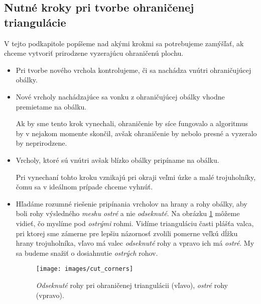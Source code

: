 \subsection{Nutné kroky pri tvorbe ohraničenej triangulácie}

V tejto podkapitole popíšeme nad akými krokmi sa potrebujeme zamýšľať, ak chceme vytvoriť prirodzene 
vyzerajúcu ohraničenú plochu.

\begin{itemize}
    \item{
        Pri tvorbe nového vrchola kontrolujeme, či sa nachádza vnútri ohraničujúcej obálky.
    }
    \item{
        Nové vrcholy nachádzajúce sa vonku z ohraničujúcej obálky vhodne premietame na obálku.

        Ak by sme tento krok vynechali, ohraničenie by síce fungovalo a algoritmus by v nejakom
        momente skončil, avšak ohraničenie by nebolo presné a vyzeralo by neprirodzene.
    }
    \item{
        Vrcholy, ktoré sú vnútri avšak blízko obálky pripíname na obálku.

        Pri vynechaní tohto kroku vznikajú pri okraji veľmi úzke a malé trojuholníky, čomu 
        sa v ideálnom prípade chceme vyhnúť.
    }
    \item{
        Hľadáme rozumné riešenie pripínania vrcholov na hrany a rohy obálky, aby boli rohy 
        výsledného \textit{meshu} 
        \textit{ostré} 
        a nie \textit{odseknuté}. Na obrázku \ref{obr:cut_corners} môžeme vidieť, čo myslíme pod 
        \textit{ostrými} rohmi. Vidíme trianguláciu časti plášťa valca, pri ktorej sme zámerne pre
        lepšiu názornosť zvolili
        pomerne veľkú dĺžku hrany trojuholníka, vľavo má valec 
        \textit{odseknuté} rohy a vpravo ich má \textit{ostré}. My sa budeme snažiť o dosiahnutie
        \textit{ostrých} rohov.

        \begin{figure}
            \centerline{\texttt{[image: images/cut\_corners]}}
            \caption[\textit{Ostré} a \textit{odseknuté} rohy pri ohraničenej triangulácii]
            {\textit{Odseknuté} rohy pri ohraničenej triangulácii (vľavo), \textit{ostré} rohy (vpravo).}
            \label{obr:cut_corners}
        \end{figure}
    }
\end{itemize}

